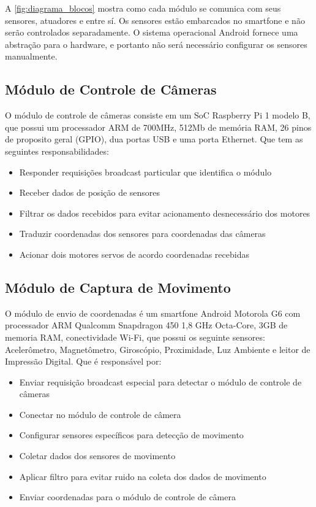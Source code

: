 A \autoref{fig:diagrama_blocos} mostra como cada módulo se comunica com seus sensores, atuadores e entre sí. Os sensores estão embarcados no smartfone e não serão controlados separadamente. O sistema operacional Android fornece uma abstração para o hardware, e portanto não será necessário configurar os sensores manualmente. 

\subsection{Módulo de Controle de Câmeras}
\label{subsec:modconcam}

O módulo de controle de câmeras consiste em um SoC Raspberry Pi 1 modelo B, que possui um processador ARM de 700MHz, 512Mb de memória RAM, 26 pinos de proposito geral (GPIO), dua portas USB e uma porta Ethernet. Que tem as seguintes responsabilidades:

\begin{itemize}
	\item Responder requisições broadcast particular que identifica o módulo
	\item Receber dados de posição de sensores
	\item Filtrar os dados recebidos para evitar acionamento desnecessário dos motores
	\item Traduzir coordenadas dos sensores para coordenadas das câmeras
	\item Acionar dois motores servos de acordo coordenadas recebidas
\end{itemize}

\subsection{Módulo de Captura de Movimento}
\label{subsec:modcapmov}

O módulo de envio de coordenadas é um smartfone Android Motorola G6 com processador ARM Qualcomm Snapdragon 450 1,8 GHz Octa-Core, 3GB de memoria RAM, conectividade Wi-Fi, que possui os seguinte sensores: Acelerômetro, Magnetômetro, Giroscópio, Proximidade, Luz Ambiente e leitor de Impressão Digital. Que é responsável por:

\begin{itemize}
	\item Enviar requisição broadcast especial para detectar o módulo de controle de câmeras
	\item Conectar no módulo de controle de câmera
	\item Configurar sensores específicos para detecção de movimento
	\item Coletar dados dos sensores de movimento
	\item Aplicar filtro para evitar ruido na coleta dos dados de movimento
	\item Enviar coordenadas para o módulo de controle de câmera
\end{itemize}

